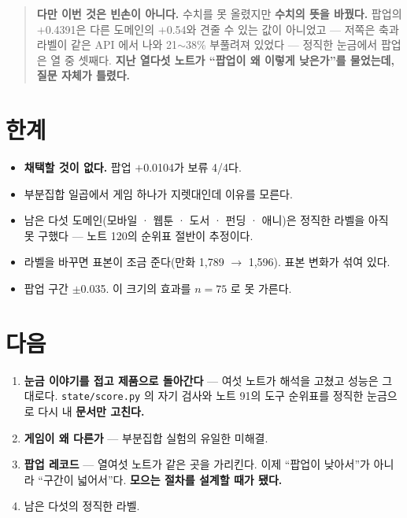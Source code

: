 \documentclass[10pt]{article}
\begin{document}

\begin{quote}\fontsize{9.5}{11.5}\selectfont
\textbf{다만 이번 것은 빈손이 아니다.} 수치를 못 올렸지만 \textbf{수치의 뜻을
바꿨다.} 팝업의 $+$0.4391은 다른 도메인의 $+$0.54와 견줄 수 있는 값이 아니었고
--- 저쪽은 축과 라벨이 같은 API 에서 나와 21$\sim$38\% 부풀려져 있었다 ---
정직한 눈금에서 팝업은 열 중 셋째다. \textbf{지난 열다섯 노트가 ``팝업이
왜 이렇게 낮은가''를 물었는데, 질문 자체가 틀렸다.}
\end{quote}

\section{한계}

\begin{itemize}[leftmargin=1.1em,itemsep=0.15em]
\item \textbf{채택할 것이 없다.} 팝업 $+$0.0104가 보류 4/4다.
\item 부분집합 일곱에서 게임 하나가 지렛대인데 이유를 모른다.
\item 남은 다섯 도메인(모바일 · 웹툰 · 도서 · 펀딩 · 애니)은 정직한 라벨을
      아직 못 구했다 --- 노트 120의 순위표 절반이 추정이다.
\item 라벨을 바꾸면 표본이 조금 준다(만화 1,789 $\to$ 1,596). 표본 변화가
      섞여 있다.
\item 팝업 구간 $\pm$0.035. 이 크기의 효과를 $n{=}75$ 로 못 가른다.
\end{itemize}

\section{다음}

\begin{enumerate}[leftmargin=1.3em,itemsep=0.15em]
\item \textbf{눈금 이야기를 접고 제품으로 돌아간다} --- 여섯 노트가 해석을
      고쳤고 성능은 그대로다. \texttt{state/score.py} 의 자기 검사와 노트 91의
      도구 순위표를 정직한 눈금으로 다시 내 \textbf{문서만 고친다.}
\item \textbf{게임이 왜 다른가} --- 부분집합 실험의 유일한 미해결.
\item \textbf{팝업 레코드} --- 열여섯 노트가 같은 곳을 가리킨다. 이제
      ``팝업이 낮아서''가 아니라 ``구간이 넓어서''다. \textbf{모으는 절차를
      설계할 때가 됐다.}
\item 남은 다섯의 정직한 라벨.
\end{enumerate}
\end{document}
